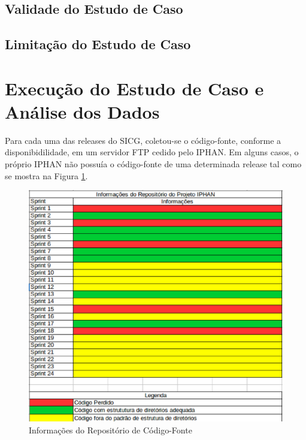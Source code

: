 \subsection{Validade do Estudo de Caso}

\subsection{Limitação do Estudo de Caso}

\section{Execução do Estudo de Caso e Análise dos Dados}


Para cada uma das releases do SICG, coletou-se o código-fonte, conforme a disponibidilidade, em um servidor FTP cedido pelo IPHAN. Em alguns casos, o próprio IPHAN não possuía o código-fonte de uma determinada release tal como se mostra na Figura \ref{fig:repositorio-IPHAN}.

\begin{figure}[ht!]
\centering
\includegraphics[keepaspectratio=true,scale=0.5]{figuras/repositorio-iphan.eps}
\caption{Informações do Repositório de Código-Fonte}
\label{fig:repositorio-IPHAN}
\end{figure}
\FloatBarrier


